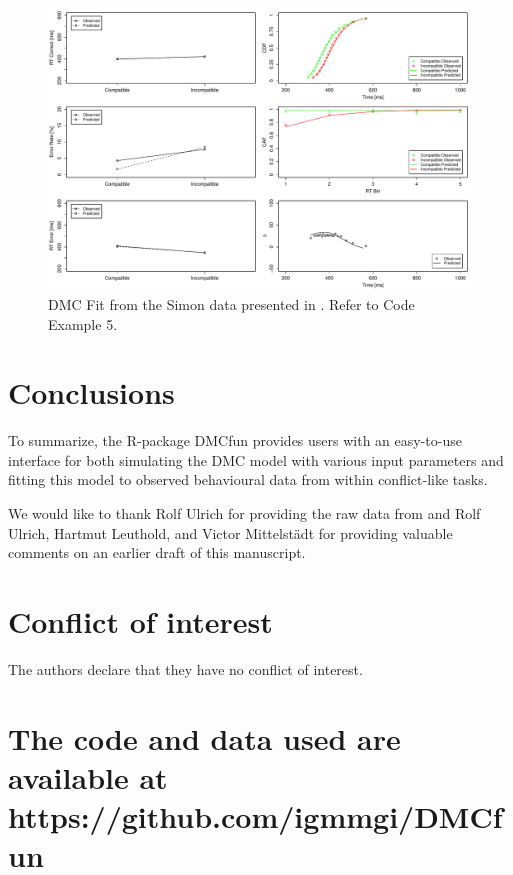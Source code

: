 \begin{figure}[H]
    \includegraphics[width=1\textwidth]{../figures/figure6.pdf}
    \caption{DMC Fit from the Simon data presented in \textcite{ulrich2015automatic}. Refer to Code Example 5.}
    \label{fig:6}
\end{figure}

\section{Conclusions}
\label{summary}
To summarize, the R-package DMCfun provides users with an easy-to-use interface
for both simulating the DMC model with various input parameters and fitting
this model to observed behavioural data from within conflict-like tasks. 

\begin{acknowledgements}
    We would like to thank Rolf Ulrich for providing the raw data from
    \textcite{ulrich2015automatic} and Rolf Ulrich, Hartmut Leuthold, and Victor
    Mittelstädt for providing valuable comments on an earlier draft of this
    manuscript.
\end{acknowledgements}

\section*{Conflict of interest}
The authors declare that they have no conflict of interest.

\section*{The code and data used are available at https://github.com/igmmgi/DMCfun}

\printbibliography

